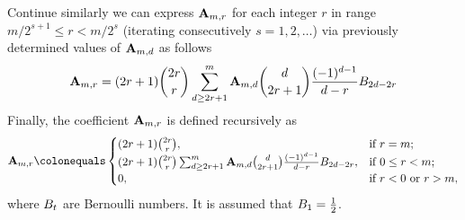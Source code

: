 Continue similarly we can express ${\mathbf{A}} \sb{m,r}$ for each integer $r$ in range $m/2^{s+1}\leq r < m/2^s$
(iterating consecutively $s=1,2,\ldots$) via previously determined values of ${\mathbf{A}} \sb{m,d}$ as follows
\begin{equation}
    {\mathbf{A}} \sb{m,r} =
    (2r+1) \binom{2r}{r} \sum_{d \geq 2r+1}^{m} {\mathbf{A}} \sb{m,d} \binom{d}{2r+1} \frac{(-1)^{d-1}}{d-r}
    {B}\sb{2d-2r}\label{eq:equation12}
\end{equation}
Finally, the coefficient ${\mathbf{A}} \sb{m,r}$ is defined recursively as
\begin{equation}
    \label{eq:def_coeff_a}
    \coeffA{m}{r} \colonequals
    \begin{cases}
    (2r+1)
        \binom{2r}{r}, & \text{if } r=m; \\
        (2r+1) \binom{2r}{r} \sum_{d \geq 2r+1}^{m} \coeffA{m}{d} \binom{d}{2r+1} \frac{(-1)^{d-1}}{d-r}
        \bernoulli{2d-2r}, & \text{if } 0 \leq r<m; \\
        0, & \text{if } r<0 \text{ or } r>m,
    \end{cases}
\end{equation}
where ${B}\sb{t}$ are Bernoulli numbers.
It is assumed that ${B}\sb{1}=\frac{1}{2}$.